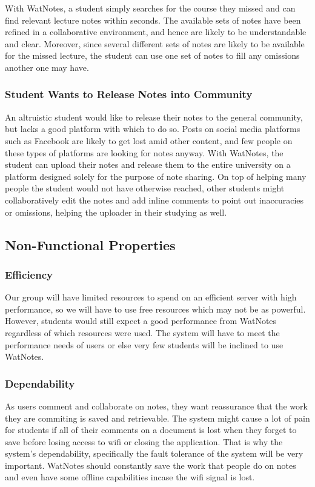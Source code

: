 \documentclass[12pt]{article}
\begin{document}
  With WatNotes, a student simply searches for the course they missed and can find relevant lecture notes within seconds. The available sets of notes have been refined in a collaborative environment, and hence are likely to be understandable and clear. Moreover, since several different sets of notes are likely to be available for the missed lecture, the student can use one set of notes to fill any omissions another one may have.
  \subsubsection{Student Wants to Release Notes into Community}
  An altruistic student would like to release their notes to the general community, but lacks a good platform with which to do so. Posts on social media platforms such as Facebook are likely to get lost amid other content, and few people on these types of platforms are looking for notes anyway. With WatNotes, the student can upload their notes and release them to the entire university on a platform designed solely for the purpose of note sharing. On top of helping many people the student would not have otherwise reached, other students might collaboratively edit the notes and add inline comments to point out inaccuracies or omissions, helping the uploader in their studying as well.
\subsection{Non-Functional Properties}
  \subsubsection{Efficiency}
  Our group will have limited resources to spend on an efficient server with high performance, so we will have to use free resources which may not be as powerful. However, students would still expect a good performance from WatNotes regardless of which resources were used. The system will have to meet the performance needs of users or else very few students will be inclined to use WatNotes.

  \subsubsection{Dependability}
  As users comment and collaborate on notes, they want reassurance that the work they are commiting is saved and retrievable. The system might cause a lot of pain for students if all of their comments on a document is lost when they forget to save before losing access to wifi or closing the application. That is why the system's dependability, specifically the fault tolerance of the system will be very important. WatNotes should constantly save the work that people do on notes and even have some offline capabilities incase the wifi signal is lost. 
\end{document}
